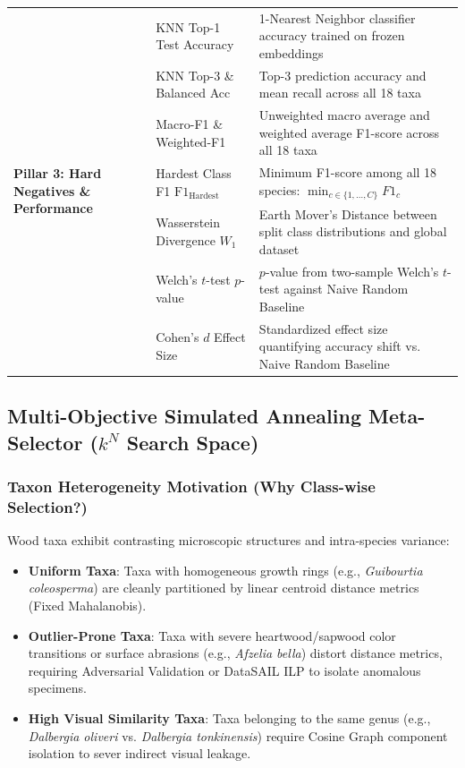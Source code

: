 \begin{table}[htbp]
{\begin{tabular}{lll}
\midrule
\multirow{7}{*}{\textbf{Pillar 3: Hard Negatives \& Performance}} 
& KNN Top-1 Test Accuracy & 1-Nearest Neighbor classifier accuracy trained on frozen embeddings \\
& KNN Top-3 \& Balanced Acc & Top-3 prediction accuracy and mean recall across all 18 taxa \\
& Macro-F1 \& Weighted-F1 & Unweighted macro average and weighted average F1-score across all 18 taxa \\
& Hardest Class F1 $\text{F1}_{\text{Hardest}}$ & Minimum F1-score among all 18 species: $\min_{c \in \{1,\dots,C\}} F1_c$ \\
& Wasserstein Divergence $W_1$ & Earth Mover's Distance between split class distributions and global dataset \\
& Welch's $t$-test $p$-value & $p$-value from two-sample Welch's $t$-test against Naive Random Baseline \\
& Cohen's $d$ Effect Size & Standardized effect size quantifying accuracy shift vs. Naive Random Baseline \\
\bottomrule
\end{tabular}%
}
\end{table}

\subsection{Multi-Objective Simulated Annealing Meta-Selector ($k^N$ Search Space)}

\subsubsection{Taxon Heterogeneity Motivation (Why Class-wise Selection?)}
Wood taxa exhibit contrasting microscopic structures and intra-species variance:
\begin{itemize}
\item \textbf{Uniform Taxa}: Taxa with homogeneous growth rings (e.g., \textit{Guibourtia coleosperma}) are cleanly partitioned by linear centroid distance metrics (\textsf{Fixed Mahalanobis}).
\item \textbf{Outlier-Prone Taxa}: Taxa with severe heartwood/sapwood color transitions or surface abrasions (e.g., \textit{Afzelia bella}) distort distance metrics, requiring \textsf{Adversarial Validation} or \textsf{DataSAIL ILP} to isolate anomalous specimens.
\item \textbf{High Visual Similarity Taxa}: Taxa belonging to the same genus (e.g., \textit{Dalbergia oliveri} vs. \textit{Dalbergia tonkinensis}) require \textsf{Cosine Graph} component isolation to sever indirect visual leakage.
\end{itemize}

